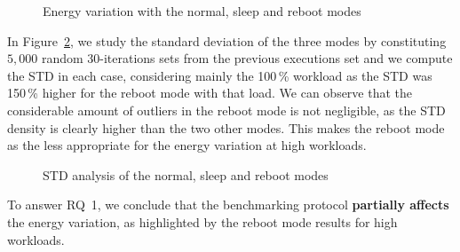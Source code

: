 \begin{figure}
    \caption{Energy variation with the \textsf{normal}, \textsf{sleep} and \textsf{reboot} modes}\label{fig:running-process}
\end{figure}

In Figure~\ref{fig:reboot}, we study the standard deviation of the three modes by constituting $5,000$ random 30-iterations sets from the previous executions set and we compute the STD in each case, considering mainly the 100\,\% workload as the STD was 150\,\% higher for the \textsf{reboot} mode with that load.
We can observe that the considerable amount of outliers in the \textsf{reboot} mode is not negligible, as the STD density is clearly higher than the two other modes.
This makes the \textsf{reboot} mode as the less appropriate for the energy variation at high workloads.

\begin{figure}
    \caption{STD analysis of the \textsf{normal}, \textsf{sleep} and \textsf{reboot} modes}\label{fig:reboot}
\end{figure}

\begin{mdframed}[skipabove=\topsep,skipbelow=\topsep]

    To answer \textsc{RQ~1}, we conclude that the benchmarking protocol \textbf{partially affects} the energy variation, as highlighted by the \textsf{reboot} mode results for high workloads.

\end{mdframed}


